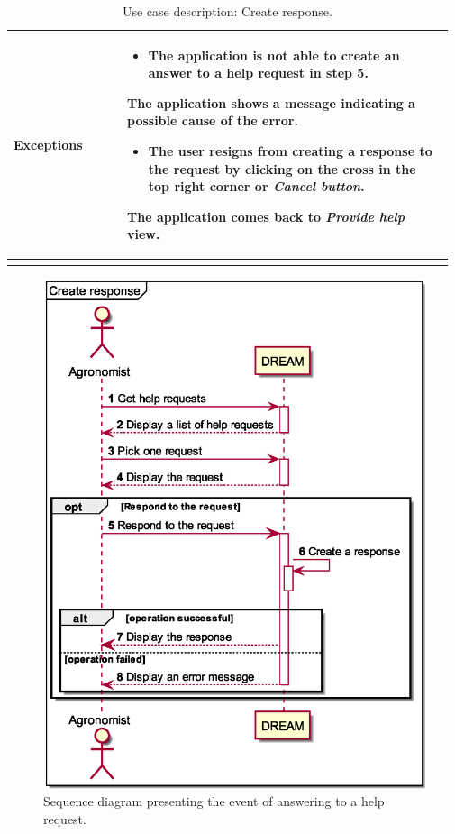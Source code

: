 \begin{longtable}{@{}p{0.25\linewidth} p{0.72\linewidth}@{}}
	\textbf{Exceptions}         & 
    \begin{itemize}[leftmargin=.4cm,noitemsep,topsep=0pt,before=\vspace{-3mm}]
	   \item The application is not able to create an answer to a help request in step 5. 
	\end{itemize}
	The application shows a message indicating a possible cause of the error.
	\begin{itemize}[leftmargin=.4cm,noitemsep,before=\vspace{-3mm}]
	   \item The user resigns from creating a response to the request by clicking on the cross in the top right corner or \textit{Cancel button}. 
	\end{itemize}
	The application comes back to \textit{Provide help} view.
	\\\bottomrule
	\caption{Use case description: Create response.} 
\end{longtable}

\begin{figure}[H]
    \centering
    \includegraphics[scale=0.6, keepaspectratio, origin=c]{diagrams/sequence/create_response}
    \caption{Sequence diagram presenting the event of answering to a help request.}
    \label{fig:sd_create_response}
\end{figure}


